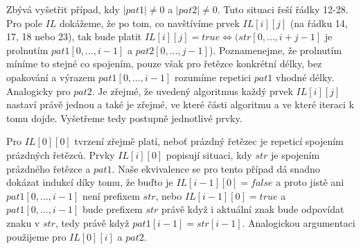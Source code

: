 \documentclass[12pt,a4paper]{article}
\theoremstyle{plain}
\begin{document}
Zbývá vyšetřit případ, kdy $ |pat1| \neq 0$ a $ |pat2| \neq 0 $. Tuto situaci řeší řádky 12-28. Pro pole $ IL $ dokážeme, že po tom, co navštívíme prvek $ IL[i][j] $ (na řádku 14, 17, 18 nebo 23), tak bude platit $ IL[i][j] = true \Leftrightarrow (str[0,\dots, i + j - 1]$ je prolnutím $ pat1[0,\dots,i - 1] $ a $ pat2[0,\dots,j - 1] $). Poznamenejme, že prolnutím míníme to stejné co spojením, pouze však pro řetězce konkrétní délky, bez opakování a výrazem $ pat1[0,\dots,i - 1] $ rozumíme repetici $ pat1 $ vhodné délky. Analogicky pro $ pat2 $. 
Je zřejmé, že uvedený algoritmus každý prvek $ IL[i][j] $ nastaví právě jednou a také je zřejmé, ve které části algoritmu a ve které iteraci k tomu dojde. Vyšetřeme tedy postupně jednotlivé prvky.

Pro $ IL[0][0] $ tvrzení zřejmě platí, neboť prázdný řetězec je repeticí spojením prázdných řetězců. Prvky $ IL[i][0] $ popisují situaci, kdy $ str $ je spojením prázdného řetězce a $ pat1 $. Naše ekvivalence se pro tento případ dá snadno dokázat indukcí díky tomu, že buďto je $ IL[i - 1][0] = false $ a proto jistě ani $ pat1[0,\dots,i - 1] $ není prefixem $ str $, nebo $ IL[i - 1][0] = true $ a $ pat1[0,\dots,i - 1] $ bude prefixem $ str $ právě když i aktuální znak bude odpovídat znaku v $ str $, tedy právě když $ pat1[i-1] = str[i-1] $. Analogickou argumentaci použijeme pro $ IL[0][i] $ a $ pat2 $.
\end{document}
